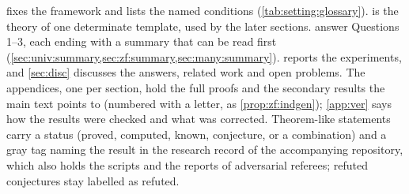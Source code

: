  fixes the framework and lists the named conditions (\cref{tab:setting:glossary}). 
is the theory of one determinate template, used by the later sections.  answer Questions
1--3, each ending with a summary that can be read first (\cref{sec:univ:summary,sec:zf:summary,sec:many:summary}).
 reports the experiments, and \cref{sec:disc} discusses the answers, related work and open problems. The
appendices, one per section, hold the full proofs and the secondary results the main text points to (numbered with a
letter, as \cref{prop:zf:indgen}); \cref{app:ver} says how the results were checked and what was corrected. Theorem-like
statements carry a status (\textsf{proved}, \textsf{computed}, \textsf{known}, \textsf{conjecture}, or a combination)
and a gray tag naming the result in the research record of the accompanying repository, which also holds the scripts and
the reports of adversarial referees; refuted conjectures stay labelled as refuted.
